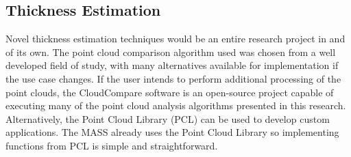 \subsection{Thickness Estimation}

Novel thickness estimation techniques would be an entire research project in and of its own. The point cloud comparison algorithm used was chosen from a well developed field of study, with many alternatives available for implementation if the use case changes. If the user intends to perform additional processing of the point clouds, the CloudCompare software is an open-source project capable of executing many of the point cloud analysis algorithms presented in this research. Alternatively, the Point Cloud Library (PCL) can be used to develop custom applications. The MASS already uses the Point Cloud Library so implementing functions from PCL is simple and straightforward.\\